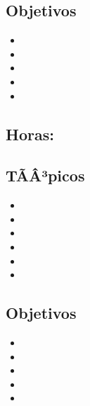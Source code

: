 \subsection*{Objetivos}
\begin{itemize}
	\item \ALCUATROObjUNO
	\item \ALCUATROObjDOS
	\item \ALCUATROObjTRES
	\item \ALCUATROObjCUATRO
	\item \ALCUATROObjCINCO
\end{itemize}

\subsection{\ALCINCODef}\label{sec:BOK-AL5}
\subsection*{Horas: \ALCINCOHours}

\subsection*{TÃÂ³picos}
\begin{itemize}
	\item \ALCINCOTopicMaquinas
	\item \ALCINCOTopicGramaticas
	\item \ALCINCOTopicProblemas
	\item \ALCINCOTopicFunciones
	\item \ALCINCOTopicEl
	\item \ALCINCOTopicImplicaciones
\end{itemize}

\subsection*{Objetivos}
\begin{itemize}
	\item \ALCINCOObjUNO
	\item \ALCINCOObjDOS
	\item \ALCINCOObjTRES
	\item \ALCINCOObjCUATRO
	\item \ALCINCOObjCINCO
\end{itemize}

\subsection{\ALSEISDef}\label{sec:BOK-AL6}

